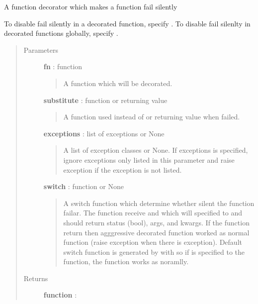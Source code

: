 \documentclass[letterpaper,10pt,english]{sphinxmanual}
\begin{document}
\begin{fulllineitems}
\label{tolerance:tolerance.decorators.tolerate}
A function decorator which makes a function fail silently

To disable fail silently in a decorated function, specify
.
To disable fail silenlty in decorated functions globally, specify
.
\begin{quote}\begin{description}
\item[{Parameters }] \leavevmode
\textbf{fn} : function
\begin{quote}

A function which will be decorated.
\end{quote}

\textbf{substitute} : function or returning value
\begin{quote}

A function used instead of  or returning value
when  failed.
\end{quote}

\textbf{exceptions} : list of exceptions or None
\begin{quote}

A list of exception classes or None. 
If exceptions is specified, ignore exceptions only listed in this
parameter and raise exception if the exception is not listed.
\end{quote}

\textbf{switch} : function or None
\begin{quote}

A switch function which determine whether silent the function failar.
The function receive  and  which will specified
to  and should return status (bool), args, and kwargs.
If the function return  then agggressive decorated function
worked as normal function (raise exception when there is exception).
Default switch function is generated by
 with
so if  is specified to the function, the function
works as noramlly.
\end{quote}

\item[{Returns }] \leavevmode
\textbf{function} :
\begin{quote}


\end{quote}
\end{description}
\end{quote}
\end{fulllineitems}
\end{document}
